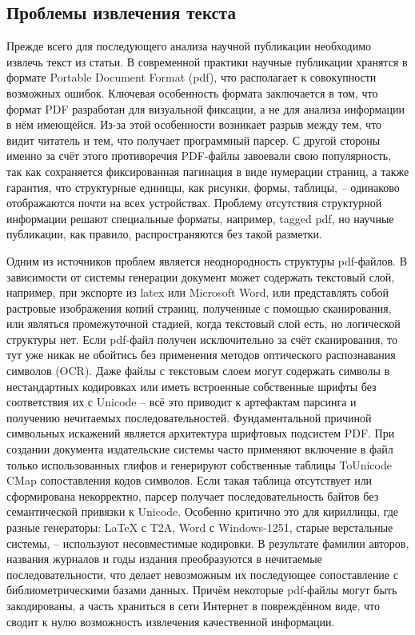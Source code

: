 \subsection{Проблемы извлечения текста}
Прежде всего для последующего анализа научной публикации необходимо извлечь текст из статьи. В современной практики научные публикации хранятся в формате Portable Document Format (pdf), что располагает к совокупности возможных ошибок. Ключевая особенность формата заключается в том, что формат PDF разработан для визуальной фиксации, а не для анализа информации в нём имеющейся\cite{bast2017benchmark}. Из-за этой особенности возникает разрыв между тем, что видит читатель и тем, что получает программный парсер. С другой стороны именно за счёт этого противоречия PDF-файлы завоевали свою популярность, так как сохраняется фиксированная пагинация в виде нумерации страниц, а также гарантия, что структурные единицы, как рисунки, формы, таблицы, -- одинаково отображаются почти на всех устройствах. Проблему отсутствия структурной информации решают специальные форматы, например, tagged pdf, но научные публикации, как правило, распространяются без такой разметки. 

Одним из источников проблем является неоднородность структуры pdf-файлов. В зависимости от системы генерации документ может содержать текстовый слой, например, при экспорте из latex или Microsoft Word, или представлять собой растровые изображения копий страниц, полученные с помощью сканирования, или являться промежуточной стадией, когда текстовый слой есть, но логической структуры нет. Если pdf-файл получен исключительно за счёт сканирования, то тут уже никак не обойтись без применения методов оптического распознавания символов (OCR). Даже файлы с текстовым слоем могут содержать символы в нестандартных кодировках или иметь встроенные собственные шрифты без соответствия их с Unicode -- всё это приводит к артефактам парсинга и получению нечитаемых последовательностей. Фундаментальной причиной символьных искажений является архитектура шрифтовых подсистем PDF. При создании документа издательские системы часто применяют включение в файл только использованных глифов и генерируют собственные таблицы ToUnicode CMap сопоставления кодов символов. Если такая таблица отсутствует или сформирована некорректно, парсер получает последовательность байтов без семантической привязки к Unicode. Особенно критично это для кириллицы, где разные генераторы: LaTeX с T2A, Word с Windows-1251, старые верстальные системы, -- используют несовместимые кодировки. В результате фамилии авторов, названия журналов и годы издания преобразуются в нечитаемые последовательности, что делает невозможным их последующее сопоставление с библиометрическими базами данных. Причём некоторые pdf-файлы могут быть закодированы, а часть храниться в сети Интернет в повреждённом виде, что сводит к нулю возможность извлечения качественной информации.

